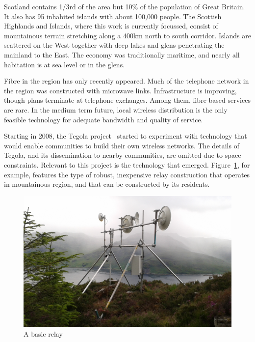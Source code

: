 
Scotland contains 1/3rd of the area but 10\% of the population of Great Britain. It also has 95  inhabited islands with about
 100,000 people. The Scottish Highlands and Islands, where this
work is currently focussed, consist of mountainous terrain stretching along a 400km north to south corridor. Islands are scattered on the West together with
deep lakes and glens penetrating the mainland to the East.  The economy was
traditionally maritime, and nearly all habitation is at sea level or in the
glens.

Fibre in the region has only recently appeared.  Much of the telephone network
in the region was constructed with microwave links. Infrastructure is improving,
though plans terminate at telephone exchanges. Among them, fibre-based
services are rare. In the medium term future, local wireless distribution is the
only feasible technology for adequate bandwidth and quality of service.

Starting in 2008, the Tegola project~\cite{tegola} started to
experiment with technology that would enable communities to build
their own wireless networks.
The details of Tegola, and its dissemination to nearby communities, are
omitted due to space constraints. Relevant to this project is the technology
that emerged. Figure~\ref{fig:mhialairigh}, for example, features the type of
robust, inexpensive relay construction that operates in mountainous region, and
that can be constructed by its residents.

\begin{figure}[h]
\centering
 \includegraphics[width=\columnwidth]{figs/mhialairigh-from-behind}
 \caption{A basic relay}
\label{fig:mhialairigh}
\end{figure}

